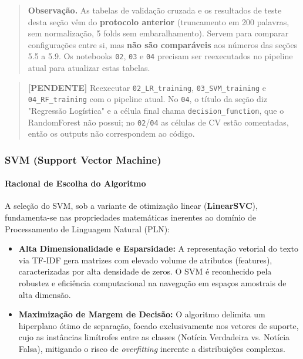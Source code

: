 \documentclass[
  brazilian,
  11pt,
]{article}
\providecommand{\tightlist}{%
  \setlength{\itemsep}{0pt}\setlength{\parskip}{0pt}}
\begin{document}
\begin{quote}
\textbf{Observação.} As tabelas de validação cruzada e os resultados de teste desta seção vêm do \textbf{protocolo anterior} (truncamento em 200 palavras, sem normalização, 5 folds sem embaralhamento). Servem para comparar configurações entre si, mas \textbf{não são comparáveis} aos números das seções 5.5 a 5.9. Os notebooks \texttt{02}, \texttt{03} e \texttt{04} precisam ser reexecutados no pipeline atual para atualizar estas tabelas.
\end{quote}

\begin{quote}
\textbf{{[}PENDENTE{]}} Reexecutar \texttt{02\_LR\_training}, \texttt{03\_SVM\_training} e \texttt{04\_RF\_training} com o pipeline atual. No \texttt{04}, o título da seção diz "Regressão Logística" e a célula final chama \texttt{decision\_function}, que o RandomForest não possui; no \texttt{02}/\texttt{04} as células de CV estão comentadas, então os outputs não correspondem ao código.
\end{quote}

\subsubsection{SVM (Support Vector Machine)}\label{svm-support-vector-machine}

\paragraph{Racional de Escolha do Algoritmo}\label{racional-de-escolha-do-algoritmo}

A seleção do SVM, sob a variante de otimização linear (\textbf{LinearSVC}), fundamenta-se nas propriedades matemáticas inerentes ao domínio de Processamento de Linguagem Natural (PLN):

\begin{itemize}
\tightlist
\item
  \textbf{Alta Dimensionalidade e Esparsidade:} A representação vetorial do texto via TF-IDF gera matrizes com elevado volume de atributos (features), caracterizadas por alta densidade de zeros. O SVM é reconhecido pela robustez e eficiência computacional na navegação em espaços amostrais de alta dimensão.
\item
  \textbf{Maximização de Margem de Decisão:} O algoritmo delimita um hiperplano ótimo de separação, focado exclusivamente nos vetores de suporte, cujo as instâncias limítrofes entre as classes (Notícia Verdadeira vs. Notícia Falsa), mitigando o risco de \emph{overfitting} inerente a distribuições complexas.
\end{itemize}
\end{document}
